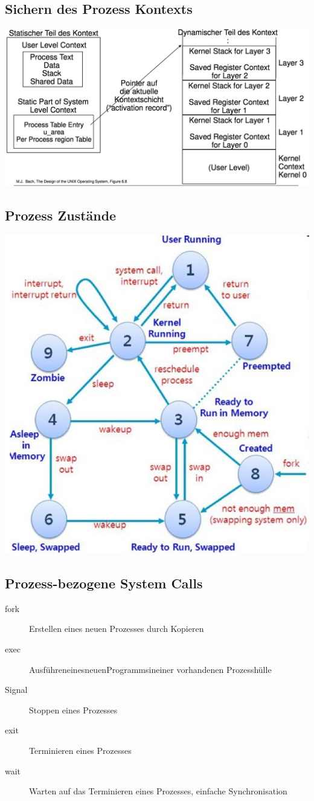 \documentclass[a4paper, 10pt]{article}
\begin{document}
\subsection{Sichern des Prozess Kontexts}
\includegraphics[scale=0.3]{save_process_context.png}

\subsection{Prozess Zustände}
\includegraphics[scale=0.5]{process_states.png}

\subsection{Prozess-bezogene System Calls}
\begin{description}
	\item[fork] Erstellen eines neuen Prozesses durch Kopieren
	\item[exec] AusführeneinesneuenProgrammsineiner vorhandenen Prozesshülle
	\item[Signal] Stoppen eines Prozesses
	\item[exit] Terminieren eines Prozesses
	\item[wait] Warten auf das Terminieren eines Prozesses, einfache Synchronisation
\end{description}
\end{document}
